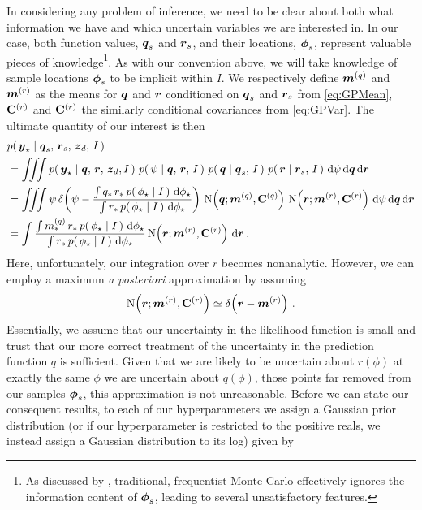 \documentclass{acmtrans2m}
\begin{document}
In considering any problem of inference, we need to be clear about both what information we have and which uncertain variables we are interested in. In our case, both function values, $\boldsymbol{q}_s$ and $\boldsymbol{r}_s$, and their locations, $\boldsymbol{\phi}_s$, represent valuable pieces of knowledge\footnote{As discussed by \cite{MCUnsound}, traditional, frequentist Monte Carlo effectively ignores the information content of $\boldsymbol{\phi}_s$, leading to several unsatisfactory features.}. As with our convention above, we will take knowledge of sample locations $\boldsymbol{\phi}_s$ to be implicit within $I$. We respectively define $\boldsymbol{m}^{(q)}$ and $\boldsymbol{m}^{(r)}$ as the means for $\boldsymbol{q}$ and $\boldsymbol{r}$ conditioned on $\boldsymbol{q}_s$ and $\boldsymbol{r}_s$ from \eqref{eq:GPMean}, $\mathbf{C}^{(r)}$ and $\mathbf{C}^{(r)}$ the similarly conditional covariances from \eqref{eq:GPVar}. The ultimate quantity of our interest is then
\begin{align}
&\p{\vyst}{\vect{q}_s,\,\vect{r}_s,\,\vzD,\,I} \nonumber\\  
& = \iiint \p{\vyst}{\vect{q},\,\vect{r},\,\vzD,I}\,\p{\psi}{\vect{q},\,\vect{r},\,I}\,\p{\vect{q}}{\vect{q}_s,\,I}\,\p{\vect{r}}{\vect{r}_s,\,I}\,\ud\psi\, \ud \vect{q}\,\ud \vect{r} \nonumber\\
& = \iiint \psi\,\dd{\psi}{\frac{\int q_\ast\,r_\ast\,\p{\phst}{I}\,\ud\phst}
{\int r_\ast\,\p{\phst}{I}\,\ud\phst}}\, \N{\vect{q}}{\vect{m}^{(q)}}{\mat{C}^{(q)}}\, \N{\vect{r}}{\vect{m}^{(r)}}{\mat{C}^{(r)}}\,\ud\psi\, \ud \vect{q}\,\ud \vect{r} \nonumber \\
& = \int \frac{\int m^{(q)}_\ast\,r_\ast\,\p{\phst}{I}\,\ud\phst}
{\int r_\ast\,\p{\phst}{I}\,\ud\phst}\, \N{\vect{r}}{\vect{m}^{(r)}}{\mat{C}^{(r)}}\,\ud \vect{r}\,.
\end{align}
Here, unfortunately, our integration over $r$ becomes nonanalytic. However, we can employ a maximum {\it a posteriori} approximation by assuming
$$
\text{N}\!\left(\boldsymbol{r};\boldsymbol{m}^{(r)},\mathbf{C}^{(r)}\right) \simeq \delta\!\left(\boldsymbol{r}-\boldsymbol{m}^{(r)}\right)\,.
$$
Essentially, we assume that our uncertainty in the likelihood function is small and trust that our more correct treatment of the uncertainty in the prediction function $q$ is sufficient. Given that we are likely to be uncertain about $r(\phi)$ at exactly the same $\phi$ we are uncertain about $q(\phi)$, those points far removed from our samples $\boldsymbol{\phi}_s$, this approximation is not unreasonable.  Before we can state our consequent results, to each of our hyperparameters we assign a Gaussian prior distribution (or if our hyperparameter is restricted to the positive reals, we instead assign a Gaussian distribution to its log) given by
\end{document}
